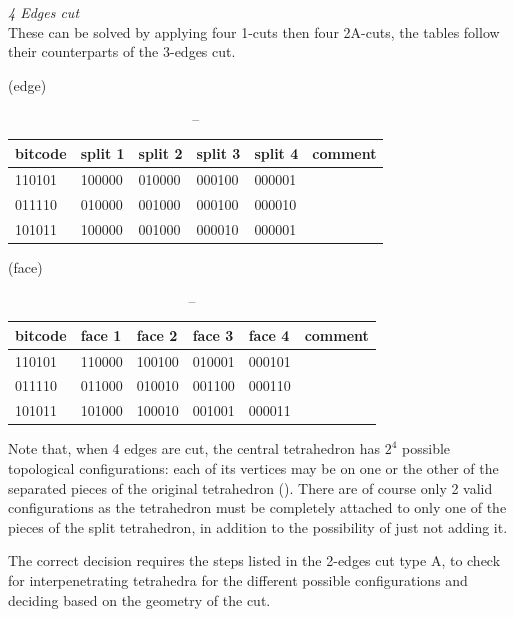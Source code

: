 \textit{4 Edges cut}\\
These can be solved by applying four 1-cuts then four 2A-cuts, the tables follow their counterparts of the 3-edges cut.

(edge)\\
\begin{table}[h]
\begin{tabular}{|l|l|l|l|l|l|}
\hline
bitcode & split 1 & split 2 & split 3 & split 4 & comment \\ \hline
110101  & 100000  & 010000  & 000100  & 000001  &         \\ \hline
011110  & 010000  & 001000  & 000100  & 000010  &         \\ \hline
101011  & 100000  & 001000  & 000010  & 000001  &         \\ \hline
\end{tabular}
\caption{--}
\end{table}



(face)\\
\begin{table}[h]
\begin{tabular}{|l|l|l|l|l|l|}
\hline
bitcode & face 1 & face 2 & face 3 & face 4 & comment \\ \hline
110101  & 110000 & 100100 & 010001 & 000101 &         \\ \hline
011110  & 011000 & 010010 & 001100 & 000110 &         \\ \hline
101011  & 101000 & 100010 & 001001 & 000011 &         \\ \hline
\end{tabular}
\caption{--}
\end{table}




Note that, when 4 edges are cut, the central tetrahedron has $2^4$ possible topological configurations: each of its vertices may be on one or the other of the separated pieces of the original tetrahedron (). There are of course only 2 valid configurations as the tetrahedron must be completely attached to only one of the pieces of the split tetrahedron, in addition to the possibility of just not adding it.

The correct decision requires the steps listed in the 2-edges cut type A, to check for interpenetrating tetrahedra for the different possible configurations and deciding based on the geometry of the cut.

